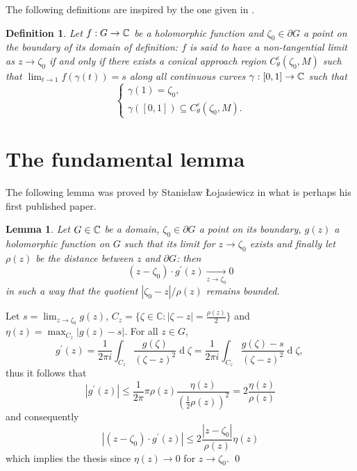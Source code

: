 \documentclass[a4paper,10pt]{article}
\newtheorem{defn}{Definition}
\newtheorem{lemma}{Lemma}
\begin{document}
The following definitions are inspired by the one given in {\rm\cite[§1.1, p.~8]{DiBiase1998}}.
\begin{defn}\label{def:ntlim} Let $f: G\to \Bbb C$ be a holomorphic function and $\zeta_0\in\partial G$ a point on the boundary of its domain of definition: $f$ is said to have a \emph{non-tangential limit} as $z\to\zeta_0$ if and only if there exists a conical approach region $C_{\theta}^{\varepsilon}(\zeta_0,M)$ such that $\lim_{t\to 1}f(\gamma(t))=s$ along all continuous curves $\gamma: [0,1]\to\Bbb C$ such that
  \begin{equation*}
    \begin{cases}
      \gamma(1)=\zeta_0, \\
      \gamma([0,1])\subseteq C_{\theta}^{\varepsilon}(\zeta_0,M).
    \end{cases}
  \end{equation*}
\end{defn}

\section{The fundamental lemma}
The following lemma was proved by Stanisław Łojasiewicz in what is perhaps his first published paper.
\begin{lemma}{\rm\cite[lemme II, p.~242]{Lojasiewicz1950}}\label{lemma:Loj} Let $G\in\Bbb C$ be a domain, $\zeta_0 \in\partial G$ a point on its boundary, $g(z)$ a holomorphic function on $G$ such that its limit for $z \to\zeta_0$ exists and finally let $\rho(z)$ be the distance between $z$ and $\partial G$: then
$$
\left(z-\zeta_0\right) \cdot g^{\prime}(z) \underset{z \to \zeta_0}{\longrightarrow} 0
$$
in such a way that the quotient $\left|\zeta_0-z\right| / \rho(z)$ remains bounded.
\end{lemma}
\proof Let  $s=\lim _{z \to\zeta_0} g(z)$, $C_z=\big\{\zeta \in \mathbb{C}: | \zeta-z \mid=\frac{\rho(z)}{2}\big\}$ and $\eta(z)=\max _{{C}_z}|g(z)-s|$. For all $z \in G$,
$$
g^{\prime}(z)=\frac{1}{2 \pi i} \int_{C_z} \frac{g(\zeta)}{(\zeta-z)^2} \operatorname{d}\!\zeta=\frac{1}{2 \pi i} \int_{C_z}\frac{g(\zeta)-s}{(\zeta-z)^2} \operatorname{d}\! \zeta \text {, }
$$
thus it follows that
$$
\left|g^{\prime}(z)\right| \leqslant \frac{1}{2 \pi} \pi \rho(z) \frac{\eta(z)}{\left(\frac{1}{2} \rho(z)\right)^2}=2 \frac{\eta(z)}{\rho(z)}
$$
and consequently
$$
\left|\left(z-\zeta_0\right) \cdot g^{\prime}(z)\right| \leqslant 2 \frac{\left|z-\zeta_0\right|}{\rho(z)} \eta(z)
$$
which implies the thesis since $\eta(z) \to 0$ for $z \to \zeta_0$. \qed
\end{document}
